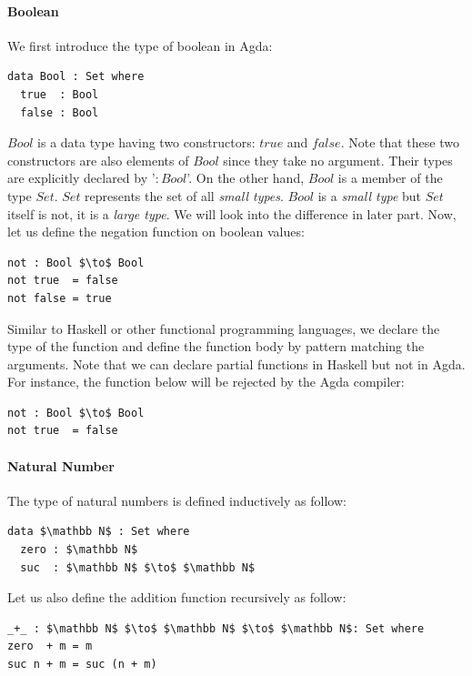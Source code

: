 \documentclass[twoside,openright,final]{bhamthesis}
\begin{document}
\paragraph{Boolean} We first introduce the type of boolean in Agda: 
\begin{lstlisting}[mathescape=true,xleftmargin=.3\textwidth]
data Bool : Set where
  true  : Bool
  false : Bool
\end{lstlisting}
\par \(Bool\) is a data type having two
constructors: \(true\) and \(false\). Note that these two constructors
are also elements of \(Bool\) since they take no argument. Their types are explicitly declared by '\(:
Bool\)'. On the other hand, \(Bool\) is a member of the type \(Set\). \(Set\)
represents the set of all \textit{small types}. \(Bool\) is a
\textit{small type} but \(Set\) itself is not, it is a \textit{large
  type}. We will look into the difference in later
part. Now, let us define the negation function on boolean values:
\begin{lstlisting}[mathescape=true,xleftmargin=.3\textwidth]
not : Bool $\to$ Bool
not true  = false
not false = true
\end{lstlisting}
\par Similar to Haskell or other functional programming languages, we
declare the type of the function and define the function body by
pattern matching the arguments. Note that we can declare partial
functions in Haskell but not in Agda. For instance, the function below
will be rejected by the Agda compiler:
\begin{lstlisting}[mathescape=true,xleftmargin=.3\textwidth]
not : Bool $\to$ Bool
not true  = false
\end{lstlisting}

\paragraph{Natural Number} The type of natural numbers is defined
inductively as follow: 
\begin{lstlisting}[mathescape=true,xleftmargin=.3\textwidth]
data $\mathbb N$ : Set where
  zero : $\mathbb N$
  suc  : $\mathbb N$ $\to$ $\mathbb N$
\end{lstlisting} 
\par Let us also define the addition function recursively as follow:
\begin{lstlisting}[mathescape=true,xleftmargin=.3\textwidth]
_+_ : $\mathbb N$ $\to$ $\mathbb N$ $\to$ $\mathbb N$: Set where
zero  + m = m
suc n + m = suc (n + m)
\end{lstlisting} 
\end{document}
